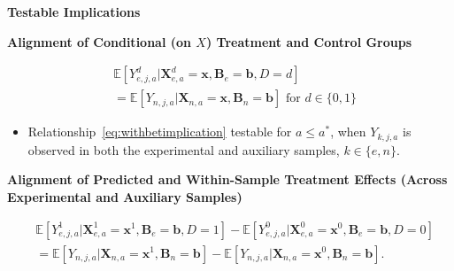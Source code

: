 \documentclass[static]{JJH-Beamer}
\begin{document}
\begin{frame}

\begin{center}
\textbf{Testable Implications}
\end{center}

\end{frame}

\begin{frame}

\begin{center}
\textbf{Alignment of Conditional (on $X$) Treatment and Control Groups}
\end{center}

\begin{align}\label{eq:withbetimplication}
&\mathbb{E} \left[ Y_{e,j,a}^d | \bm{X}_{e,a}^d = \bm{x}, \bm{B}_{e} = \bm{b}, D = d   \right]   \\
&= \mathbb{E} \left[ Y_{n,j,a} | \bm{X}_{n,a} = \bm{x}, \bm{B}_{n} = \bm{b} \right] \text{ for }  d \in \{0,1\}\nonumber
\end{align}

\begin{itemize}
\item Relationship~\eqref{eq:withbetimplication} testable for $a \leq  a^*$, when $Y_{k,j,a}$ is observed in both the experimental and auxiliary samples, $k \in \{e,n\}$.
\end{itemize}

\end{frame}

\begin{frame}

\begin{center}
\textbf{Alignment of Predicted and Within-Sample Treatment Effects (Across Experimental and Auxiliary Samples)}
\end{center}

\begin{align}
&\mathbb{E} \left[ Y_{e,j,a}^1 |  \bm{X}_{e,a}^1 = \bm{x}^1, \bm{B}_e = \bm{b}, D = 1 \right] -\mathbb{E} \left[ Y_{e,j,a}^0 |  \bm{X}_{e,a}^0 = \bm{x}^0, \bm{B}_e = \bm{b}, D = 0 \right] \\
&=\mathbb{E} \left[ Y_{n,j,a} | \bm{X}_{n,a} = \bm{x}^1, \bm{B}_n = \bm{b} \right] \nonumber - \mathbb{E} \left[ Y_{n,j,a} | \bm{X}_{n,a} = \bm{x}^0, \bm{B}_n = \bm{b} \right].
\end{align}

\end{frame}
\end{document}
